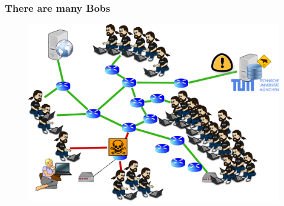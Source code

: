 \begin{frame}
\frametitle{There are many Bobs}
  \begin{block}{}
    \vskip -1.2cm
    \begin{figure}[t]
    \centering
     \includegraphics[scale=.36]{figures/hunting-4-manyreporting}
    \end{figure}
  \end{block}
\end{frame}






